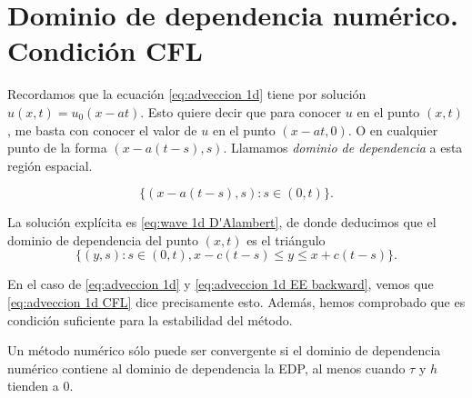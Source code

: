 \section{Dominio de dependencia numérico. Condición CFL}

Recordamos que la ecuación \eqref{eq:adveccion 1d} tiene por solución $u(x,t) = u_0(x - at)$. Esto quiere decir que para conocer $u$ en el punto $(x,t)$, me basta con conocer el valor de $u$ en el punto $(x-at, 0)$. O en cualquier punto de la forma $(x-a(t-s),s)$.
Llamamos \emph{dominio de dependencia} a esta región espacial.
\begin{example}
    \begin{equation*}
        \Big\{ (x - a(t-s) , s) : s \in (0,t) \Big\}.
    \end{equation*}
\end{example}

\begin{example}[Dominio de dependencia de \eqref{eq:wave} en $d=1$]
    La solución explícita es \eqref{eq:wave 1d D'Alambert}, de donde deducimos que
    el dominio de dependencia del punto $(x,t)$ es el triángulo
    $$
        \Big\{ (y,s) : s \in (0,t), x-c (t-s) \le y \le x + c(t-s) \Big\} .
    $$
\end{example}
En el caso de \eqref{eq:adveccion 1d} y \eqref{eq:adveccion 1d EE backward}, vemos que \eqref{eq:adveccion 1d CFL} dice precisamente esto. Además, hemos comprobado que es condición suficiente para la estabilidad del método.

\begin{remark}
    Un método numérico sólo puede ser convergente si el dominio de dependencia numérico contiene al dominio de dependencia la EDP, al menos cuando $\tau$ y $h$ tienden a $0$.
\end{remark}




